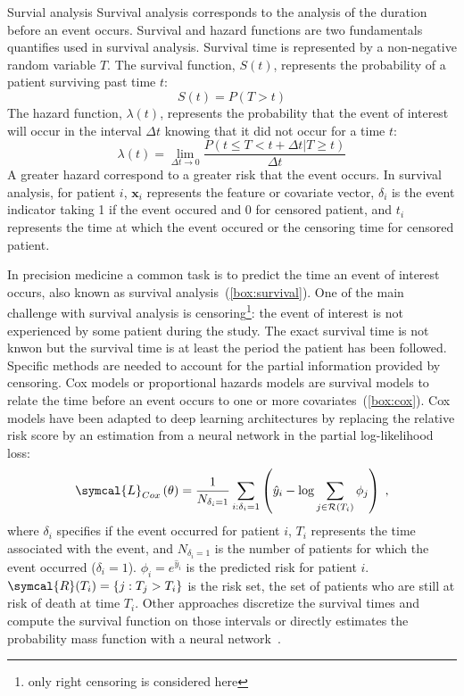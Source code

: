 \documentclass[../main.tex]{subfiles}
\begin{document}
		\begin{mybox}[label={box:survival}]{Survial analysis}
			Survival analysis corresponds to the analysis of the duration before an event occurs.
			Survival and hazard functions are two fundamentals quantifies used in survival analysis.
			Survival time is represented by a non-negative random variable \(T\).
			The survival function, \(S(t)\), represents the probability of a patient surviving past time \(t\):
			\[S(t) = P(T > t)\]
			The hazard function, \(\lambda(t)\), represents the probability that the event of interest will occur in the interval \(\Delta t\) knowing that it did not occur for a time \(t\):
			\[\lambda(t) = \lim_{\Delta t \to 0} \frac{P(t \leq T < t + \Delta t | T \geq t)}{\Delta t}\]
			A greater hazard correspond to a greater risk that the event occurs.
			In survival analysis, for patient \(i\), \(\symbf{x}_{i}\) represents the feature or covariate vector, \(\delta_{i}\) is the event indicator taking 1 if the event occured and 0 for censored patient, and \(t_{i}\) represents the time at which the event occured or the censoring time for censored patient.
		\end{mybox}

		In precision medicine a common task is to predict the time an event of interest occurs, also known as survival analysis~(\cref{box:survival}).
		One of the main challenge with survival analysis is censoring\footnote{only right censoring is considered here}: the event of interest is not experienced by some patient during the study.
		The exact survival time is not knwon but the survival time is at least the period the patient has been followed.
		Specific methods are needed to account for the partial information provided by censoring.
		Cox models or proportional hazards models are survival models to relate the time before an event occurs to one or more covariates~(\cref{box:cox}).
		Cox models have been adapted to deep learning architectures by replacing the relative risk score by an estimation from a neural network in the partial log-likelihood loss:
		\begin{equation}
			\symcal{L}_{Cox}\left(\theta\right) = \frac{1}{N_{\delta_i = 1}} \sum_{i:\delta_i=1} \left(\hat{y}_i - \log \sum_{j \in \mathcal{R}(T_i)}\phi_j \right)\; \text{,} \label{eq:cox_loss}
		\end{equation}
		where \(\delta_i\) specifies if the event occurred for patient \(i\), \(T_i\) represents the time associated with the event, and \(N_{\delta_i = 1}\) is the number of patients for which the event occurred (\(\delta_i = 1\)).
		\(\phi_i = e^{\hat{y}_i}\) is the predicted risk for patient \(i\).
		\(\symcal{R}(T_i) = \{j: T_j > T_i\}\) is the risk set, the set of patients who are still at risk of death at time \(T_i\).
		Other approaches discretize the survival times and compute the survival function on those intervals or directly estimates the probability mass function with a neural network~\cite{Lee2018}.
\end{document}
